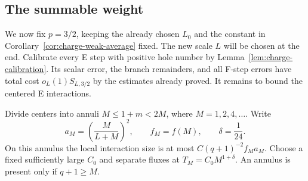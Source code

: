 \subsection{The summable weight}

We now fix $p=3/2$, keeping the already chosen $L_0$ and the constant
in Corollary~\ref{cor:charge-weak-average} fixed.  The new scale $L$
will be chosen at the end.  Calibrate every E step with positive
hole number by Lemma~\ref{lem:charge-calibration}.  Its scalar error,
the branch remainders, and all F-step errors have total cost
$o_L(1)S_{L,3/2}$ by the estimates already proved.  It remains to
bound the centered E interactions.

Divide centers into annuli $M\le1+m<2M$, where $M=1,2,4,\ldots$.
Write
\[
 a_M=\left(\frac{M}{L+M}\right)^2,\qquad f_M=f(M),\qquad
 \delta=\frac1{24}.
\]
On this annulus the local interaction size is at most
$C(q+1)^{-2}f_Ma_M$.  Choose a fixed sufficiently large $C_0$ and
separate fluxes at $T_M=C_0M^{1+\delta}$.
An annulus is present only if $q+1\ge M$.

